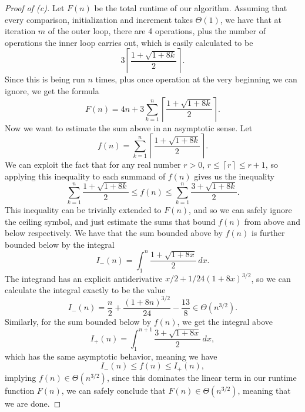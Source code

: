 \documentclass[11pt,a4paper]{article}
\begin{document}
\begin{proof}[Proof of (c)]
 Let $F(n)$ be the total runtime of our algorithm. Assuming that every comparison, initialization and increment takes $\Theta(1)$, we have that at iteration $m$ of the outer loop, there are 4 operations, plus the number of operations the inner loop carries out, which is easily calculated to be $$3 \left\lceil \frac{1 + \sqrt{1 + 8k} }{2} \right\rceil.
$$
Since this is being run $n$ times, plus once operation at the very beginning we can ignore, we get the formula 
   \[ 
 F(n) = 4n + 3 \sum_{k=1}^{n} \left\lceil \frac{1 + \sqrt{1 + 8k} }{2} \right\rceil.
 \] 
Now we want to estimate the sum above in an asymptotic sense. Let 
 \[
f(n) = \sum_{k=1}^{n} \left\lceil \frac{1 + \sqrt{1  + 8k }  }{2} \right\rceil.
\]
We can exploit the fact that for any real number $r>0$, 
$r \leq  \left\lceil r \right\rceil \leq  r+1$, so applying this inequality to each summand of $f(n)$ gives us the inequality \[
\sum_{k=1}^{n} \frac{1+ \sqrt{1 + 8k} }{2} \leq  f(n) \leq \sum_{k=1}^{n} \frac{3+\sqrt{1 + 8k} }{2}.
\] This inequality can be trivially extended to $F(n)$, and so we can safely ignore the ceiling symbol, and just estimate the sums that bound $f(n)$ from above and below respectively. 
We have that the sum bounded above by $f(n)$ is further bounded below by the integral 
\[
I_{-}(n) = \int_{1}^{n}  \frac{1+ \sqrt{1 + 8x} }{2} \, dx. 
\] The integrand has an explicit antiderivative $x /2 + 1 /24 (1+ 8x)^{3 / 2}$, so we can calculate the integral exactly to be the value \[
I_{-}(n) = \frac{n}{2} + \frac{(1 + 8n)^{3 /2}}{24} - \frac{13}{8} \in \Theta(n^{3 /2}).
\] 
Similarly, for the sum bounded below by $f(n)$, we get the integral above \[
I_{+}(n) = \int_{1}^{n+1}  \frac{3+ \sqrt{1 + 8x} }{2} \, dx,
\] which has the same asymptotic behavior, meaning we have \[
I_{-}(n) \leq  f(n) \leq I_{+}(n),
\] implying $f(n) \in \Theta(n^{3 /2})$, since this dominates the linear term in our runtime function $F(n)$, we can safely conclude that $F(n) \in  \Theta(n^{3 /2})$, meaning that we are done.
\end{proof}
\end{document}
